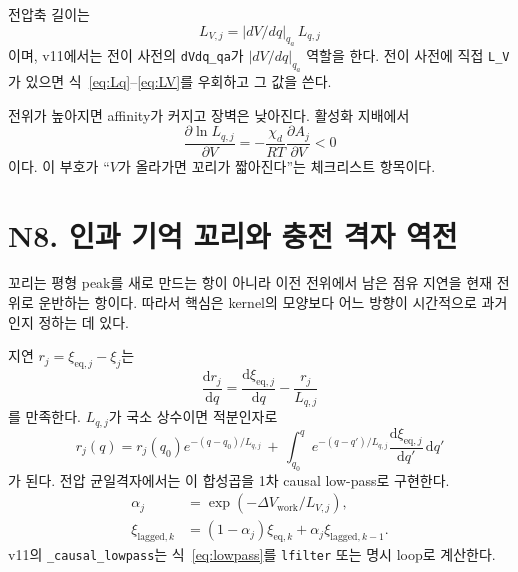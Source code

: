 \documentclass[11pt,a4paper]{article}
\newcommand{\dd}{\mathrm{d}}
\newcommand{\eq}{\mathrm{eq}}
\newcommand{\work}{\mathrm{work}}
\newcommand{\lag}{\mathrm{lagged}}
\begin{document}
전압축 길이는
\begin{equation}
\boxed{\;L_{V,j}=|dV/dq|_{q_a}\,L_{q,j}\;}
\label{eq:LV}
\end{equation}
이며, v11에서는 전이 사전의 \texttt{dVdq\_qa}가 $|dV/dq|_{q_a}$ 역할을 한다. 전이 사전에 직접 \texttt{L\_V}가 있으면 식~\eqref{eq:Lq}--\eqref{eq:LV}를 우회하고 그 값을 쓴다.

전위가 높아지면 affinity가 커지고 장벽은 낮아진다. 활성화 지배에서
\begin{equation}
\frac{\partial\ln L_{q,j}}{\partial V}
=-\frac{\chi_d}{RT}\frac{\partial A_j}{\partial V}<0
\label{eq:dlnLdV}
\end{equation}
이다. 이 부호가 ``$V$가 올라가면 꼬리가 짧아진다''는 체크리스트 항목이다.

\section{N8. 인과 기억 꼬리와 충전 격자 역전}\label{sec:N8}
꼬리는 평형 peak를 새로 만드는 항이 아니라 이전 전위에서 남은 점유 지연을 현재 전위로 운반하는 항이다. 따라서 핵심은 kernel의 모양보다 어느 방향이 시간적으로 과거인지 정하는 데 있다.

지연 $r_j=\xi_{\eq,j}-\xi_j$는
\begin{equation}
\frac{\dd r_j}{\dd q}=\frac{\dd \xi_{\eq,j}}{\dd q}-\frac{r_j}{L_{q,j}}
\label{eq:rodeo}
\end{equation}
를 만족한다. $L_{q,j}$가 국소 상수이면 적분인자로
\begin{equation}
r_j(q)=r_j(q_0)e^{-(q-q_0)/L_{q,j}}
\,+\,\int_{q_0}^{q}
e^{-(q-q')/L_{q,j}}\frac{\dd\xi_{\eq,j}}{\dd q'}\,\dd q'
\label{eq:memory}
\end{equation}
가 된다. 전압 균일격자에서는 이 합성곱을 1차 causal low-pass로 구현한다.
\begin{align}
\alpha_j&=\exp(-\Delta V_{\work}/L_{V,j}),\label{eq:alpha}\\
\xi_{\lag,k}&=(1-\alpha_j)\xi_{\eq,k}+\alpha_j\xi_{\lag,k-1}.
\label{eq:lowpass}
\end{align}
v11의 \texttt{\_causal\_lowpass}는 식~\eqref{eq:lowpass}를 \texttt{lfilter} 또는 명시 loop로 계산한다.
\end{document}
